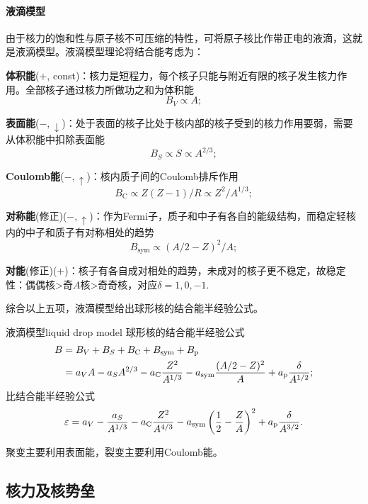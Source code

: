 \paragraph{液滴模型}
由于核力的饱和性与原子核不可压缩的特性，可将原子核比作带正电的液滴，这就是液滴模型。液滴模型理论将结合能考虑为：
\begin{compactenum}
	\item\textbf{体积能}($+$, const)：核力是短程力，每个核子只能与附近有限的核子发生核力作用。全部核子通过核力所做功之和为体积能
	\[
		B_V\propto A;
	\]
	\item\textbf{表面能}($-,\downarrow$)：处于表面的核子比处于核内部的核子受到的核力作用要弱，需要从体积能中扣除表面能
	\[
		B_S\propto S\propto A^{2/3};
	\]
	\item\textbf{Coulomb能}($-,\uparrow$)：核内质子间的Coulomb排斥作用
	\[
		B_\mathrm C\propto Z(Z-1)/R\propto Z^2/A^{1/3};
	\]
	\item\textbf{对称能}(修正)($-,\uparrow$)：作为Fermi子，质子和中子有各自的能级结构，而稳定轻核内的中子和质子有对称相处的趋势
	\[
		B_\mathrm{sym}\propto(A/2-Z)^2/A;
	\]
	\item\textbf{对能}(修正)($+$)：核子有各自成对相处的趋势，未成对的核子更不稳定，故稳定性：偶偶核>奇$A$核>奇奇核，对应$\delta=1,0,-1.$
\end{compactenum}
综合以上五项，液滴模型给出球形核的结合能半经验公式。
\begin{theorem}{液滴模型}{liquid drop model}
	球形核的结合能半经验公式
	\begin{align}\notag
		B&=B_V+B_S+B_\mathrm C+B_\mathrm{sym}+B_\mathrm p\\\label{liquid-drop model BE}
		&=a_VA-a_SA^{2/3}-a_\mathrm C\frac{Z^2}{A^{1/3}}-a_\mathrm{sym}\frac{(A/2-Z)^2}{A}+a_\mathrm p\frac{\delta}{A^{1/2}};
	\end{align}
	比结合能半经验公式
	\begin{align}\label{liquid-drop model SBE}
		\varepsilon=a_V-\frac{a_S}{A^{1/3}}-a_\mathrm C\frac{Z^2}{A^{4/3}}-a_\mathrm{sym}\left(\frac12-\frac ZA\right)^2+a_\mathrm p\frac{\delta}{A^{3/2}}.
	\end{align}
\end{theorem}
聚变主要利用表面能，裂变主要利用Coulomb能。

\subsection{核力及核势垒}
